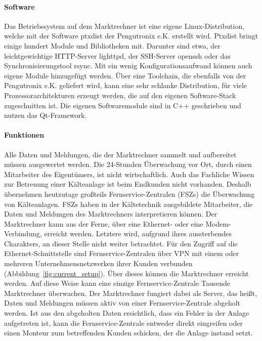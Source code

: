 \documentclass[11pt,a4paper]{report}
\begin{document}
\paragraph{Software}

Das Betriebssystem auf dem Marktrechner ist eine eigene Linux-Distribu\-tion, welche mit der Software ptxdist der Pengutronix e.K. erstellt wird. Ptxdist bringt einige hundert Module und Bibliotheken mit. Darunter sind etwa, der leichtgewichtige HTTP-Server lighttpd, der SSH-Server openssh oder das Synchronisierungstool rsync. Mit ein wenig Konfigurationsaufwand können auch eigene Module hinzugefügt werden. Über eine Toolchain, die ebenfalls von der Pengutronix e.K. geliefert wird, kann eine sehr schlanke Distribution, für viele Prozessorarchitekturen erzeugt werden, die auf den eigenen Software-Stack zugeschnitten ist. Die eigenen Softwaremodule sind in C++ geschrieben und nutzen das Qt-Framework. 

\paragraph{Funktionen} \label{para:architektur}

Alle Daten und Meldungen, die der Marktrechner sammelt und aufbereitet müssen ausgewertet werden. Die 24-Stunden Überwachung vor Ort, durch einen Mitarbeiter des Eigentümers, ist nicht wirtschaftlich. Auch das Fachliche Wissen zur Betreuung einer Kälteanlage ist beim Endkunden nicht vorhanden. Deshalb übernehmen heutzutage großteils Fernservice-Zentralen (FSZs) die Überwachung von Kälteanlagen. FSZs haben in der Kältetechnik ausgebildete Mitarbeiter, die Daten und Meldungen des Marktrechners interpretieren können. Der Marktrechner kann aus der Ferne, über eine Ethernet- oder eine Modem-Verbindung, erreicht werden. Letztere wird, aufgrund ihres aussterbendes Charakters, an dieser Stelle nicht weiter betrachtet. Für den Zugriff auf die Ethernet-Schnittstelle sind Fernservice-Zentralen über VPN mit einem oder mehreren Unternehmensnetzwerken ihrer Kunden verbunden (Abbildung~\ref{fig:current_setup}). Über dieses können die Marktrechner erreicht werden. Auf diese Weise kann eine einzige Fernservice-Zentrale Tausende Marktrechner überwachen. Der Marktrechner fungiert dabei als Server, das heißt, Daten und Meldungen müssen aktiv von einer Fernservice-Zentrale abgeholt werden. Ist aus den abgeholten Daten ersichtlich, dass ein Fehler in der Anlage aufgetreten ist, kann die Fernservice-Zentrale entweder direkt eingreifen oder einen Monteur zum betreffenden Kunden schicken, der die Anlage instand setzt.
\end{document}
